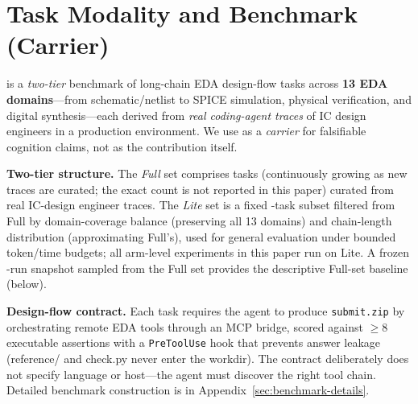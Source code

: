 \section{Task Modality and Benchmark (Carrier)}
\label{sec:benchmark}

\bench{} is a \emph{two-tier} benchmark of long-chain EDA design-flow tasks across \textbf{13 EDA domains}---from schematic/netlist to SPICE simulation, physical verification, and digital synthesis---each derived from \emph{real coding-agent traces} of IC design engineers in a production environment. We use \bench{} as a \emph{carrier} for falsifiable cognition claims, not as the contribution itself.

\textbf{Two-tier structure.} The \emph{Full} set comprises \FullScale{} tasks (continuously growing as new traces are curated; the exact count is not reported in this paper) curated from real IC-design engineer traces. The \emph{Lite} set is a fixed \LiteSet{}-task subset filtered from Full by domain-coverage balance (preserving all 13 domains) and chain-length distribution (approximating Full's), used for general evaluation under bounded token/time budgets; all arm-level experiments in this paper run on Lite. A frozen \Neval{}-run snapshot sampled from the Full set provides the descriptive Full-set baseline (below).

\textbf{Design-flow contract.} Each task requires the agent to produce \texttt{submit.zip} by orchestrating remote EDA tools through an MCP bridge, scored against $\geq 8$ executable assertions with a \texttt{PreToolUse} hook that prevents answer leakage (reference/ and check.py never enter the workdir). The contract deliberately does not specify language or host---the agent must discover the right tool chain. Detailed benchmark construction is in Appendix~\ref{sec:benchmark-details}.


